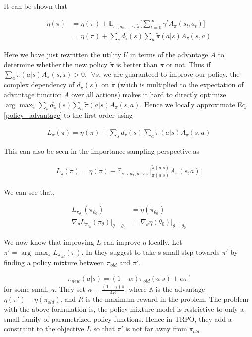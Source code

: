 \documentclass{article}[11pt]
\begin{document}
It can be shown that 

\begin{align}
\eta(\tilde{\pi}) &= \eta(\pi) + \mathbb{E}_{s_0,a_0, ... \sim \tilde{\pi}} \Bigg[ \sum_{t=0}^\infty \gamma^t A_\pi(s_t,a_t) \Bigg]\\
\label{policy_advantage}
&= \eta(\pi) + \sum_s d_{\tilde{\pi}}(s) \sum_a\tilde{\pi}(a|s)A_\pi(s,a)
\end{align}

Here we have just rewritten the utility $U$ in terms of the advantage $A$ to determine whether the new policy $\tilde{\pi}$ is better than $\pi$ or not. Thus if $\sum_a\tilde{\pi}(a|s)A_\pi(s,a) >0, \ \ \forall s$, we are guaranteed to improve our policy. the complex dependency of $d_{\tilde{\pi}}(s)$ on $\tilde{\pi}$ (which is multiplied to the expectation of advantage function $A$  over all actions) makes it hard to directly optimize $\arg \max_{\tilde{\pi}}  \sum_s d_{\tilde{\pi}}(s) \sum_a\tilde{\pi}(a|s)A_\pi(s,a)$. Hence we locally approximate Eq. \ref{policy_advantage} to the first order using 

\begin{align*}
L_\pi(\tilde{\pi}) =  \eta(\pi) + \sum_s d_{\pi}(s) \sum_a\tilde{\pi}(a|s)A_\pi(s,a)
\end{align*}

This can also be seen in the importance sampling perspective as

\begin{align}
\label{surrogate_objective}
L_\pi(\tilde{\pi}) =\eta(\pi) + \mathbb{E}_{s \sim d_{\pi},a \sim \pi} \Bigg[ \frac{\tilde{\pi}(a|s)}{\pi(a|s)} A_{\pi}(s,a) \Bigg]
\end{align}

We can see that, 

\begin{align*}
L_{\pi_{\theta_0}}(\pi_{\theta_0}) &= \eta (\pi_{\theta_0})\\
\nabla_\theta L_{\pi_{\theta_0}}(\pi_{\theta})|_{\theta = \theta_0} &= \nabla_\theta \eta (\theta_0)|_{\theta = \theta_0}
\end{align*}

We now know that improving $L$ can improve $\eta$ locally. Let $\pi' = \arg \max_{\pi} L_{\pi_{old}} (\pi)$. In \cite{kakade2002approximately} they suggest to take s small step towards $\pi'$ by finding a policy mixture between $\pi_{old}$ and $\pi'$.

\begin{align*}
\pi_{new}(a|s) = (1-\alpha) \pi_{old}(a|s) + \alpha \pi'
\end{align*} for some small $\alpha$. They set $\alpha = \frac{(1-\gamma)\mathbb{A}}{4R}$, where $\mathbb{A}$ is the advantage $\eta(\pi') - \eta(\pi_{old})$, and $R$ is the maximum reward in the problem.  The problem with the above formulation is, the policy mixture model is restrictive to only a small family of parametrized policy functions. Hence in TRPO, they add a constraint to the objective $L$ so that $\pi'$ is not far away from $\pi_{old}$
\end{document}
